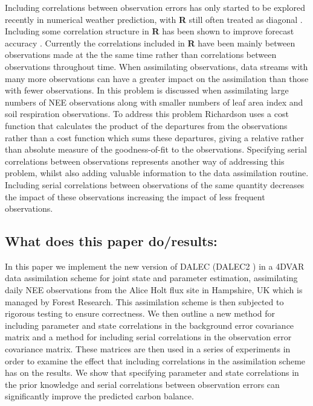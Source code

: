 \documentclass[11pt]{article}
\begin{document}
Including correlations between observation errors has only started to be explored recently in numerical weather prediction, with \textbf{R} still often treated as diagonal \citep{Stewart2013}. Including some correlation structure in \textbf{R} has been shown to improve forecast accuracy \citep{weston2014accounting}. Currently the correlations included in \textbf{R} have been mainly between observations made at the the same time rather than correlations between observations throughout time. When assimilating observations, data streams with many more observations can have a greater impact on the assimilation than those with fewer observations. In \citet{richardson2010estimating} this problem is discussed when assimilating large numbers of NEE observations along with smaller numbers of leaf area index and soil respiration observations. To address this problem Richardson uses a cost function that calculates the product of the departures from the observations rather than a cost function which sums these departures, giving a relative rather than absolute measure of the goodness-of-fit to the observations. Specifying serial correlations between observations represents another way of addressing this problem, whilst also adding valuable information to the data assimilation routine. Including serial correlations between observations of the same quantity decreases the impact of these observations \citep{jarvinen1999variational} increasing the impact of less frequent observations. 

\subsection{What does this paper do/results:}
In this paper we implement the new version of DALEC (DALEC2 \citep{Bloom2015}) in a 4DVAR data assimilation scheme for joint state and parameter estimation, assimilating daily NEE observations from the Alice Holt flux site in Hampshire, UK which is managed by Forest Research. This assimilation scheme is then subjected to rigorous testing to ensure correctness. We then outline a new method for including parameter and state correlations in the background error covariance matrix and a method for including serial correlations in the observation error covariance matrix. These matrices are then used in a series of experiments in order to examine the effect that including correlations in the assimilation scheme has on the results. We show that specifying parameter and state correlations in the prior knowledge and serial correlations between observation errors can significantly improve the predicted carbon balance.
\end{document}
